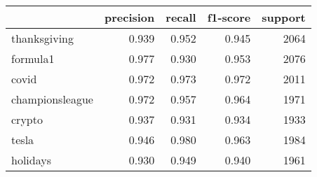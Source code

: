 \begin{tabular}{lrrrr}
\toprule
{} &  precision &  recall &  f1-score &  support \\
\midrule
thanksgiving    &      0.939 &   0.952 &     0.945 &     2064 \\
formula1        &      0.977 &   0.930 &     0.953 &     2076 \\
covid           &      0.972 &   0.973 &     0.972 &     2011 \\
championsleague &      0.972 &   0.957 &     0.964 &     1971 \\
crypto          &      0.937 &   0.931 &     0.934 &     1933 \\
tesla           &      0.946 &   0.980 &     0.963 &     1984 \\
holidays        &      0.930 &   0.949 &     0.940 &     1961 \\
\bottomrule
\end{tabular}
